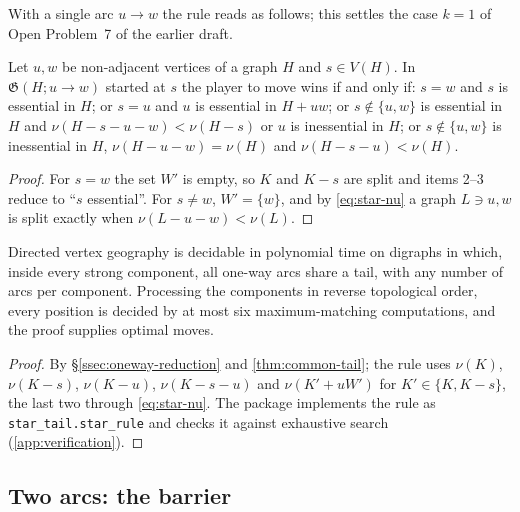 \documentclass[final]{siamart0516}
\numberwithin{theorem}{section}
\numberwithin{equation}{section}
\theoremstyle{siamnonum}
\theoremstyle{plain}
\newcommand{\code}[1]{{\ttfamily\nolinkurl{#1}}}
\newcommand{\game}{\mathfrak{G}}          %
\begin{document}
With a single arc $u\to w$ the rule reads as follows; this settles the case $k=1$ of Open Problem~7 of the earlier draft.

\begin{corollary}\label{cor:one-arc}
Let $u,w$ be non-adjacent vertices of a graph $H$ and $s\in V(H)$. In $\game(H;u\to w)$ started at $s$ the player to move wins if and only if: $s=w$ and $s$ is essential in $H$; or $s=u$ and $u$ is essential in $H+uw$; or $s\notin\{u,w\}$ is essential in $H$ and $\nu(H-s-u-w)<\nu(H-s)$ or $u$ is inessential in $H$; or $s\notin\{u,w\}$ is inessential in $H$, $\nu(H-u-w)=\nu(H)$ and $\nu(H-s-u)<\nu(H)$.
\end{corollary}
\begin{proof}
For $s=w$ the set $W'$ is empty, so $K$ and $K-s$ are split and items 2--3 reduce to ``$s$ essential''. For $s\neq w$, $W'=\{w\}$, and by \eqref{eq:star-nu} a graph $L\ni u,w$ is split exactly when $\nu(L-u-w)<\nu(L)$.
\end{proof}

\begin{corollary}\label{cor:star-dvg}
Directed vertex geography is decidable in polynomial time on digraphs in which, inside every strong component, all one-way arcs share a tail, with any number of arcs per component. Processing the components in reverse topological order, every position is decided by at most six maximum-matching computations, and the proof supplies optimal moves.
\end{corollary}
\begin{proof}
By \S\ref{ssec:oneway-reduction} and \cref{thm:common-tail}; the rule uses $\nu(K)$, $\nu(K-s)$, $\nu(K-u)$, $\nu(K-s-u)$ and $\nu(K'+uW')$ for $K'\in\{K,K-s\}$, the last two through \eqref{eq:star-nu}. The package implements the rule as \code{star_tail.star_rule} and checks it against exhaustive search (\cref{app:verification}).
\end{proof}

\subsection{Two arcs: the barrier}
\end{document}
